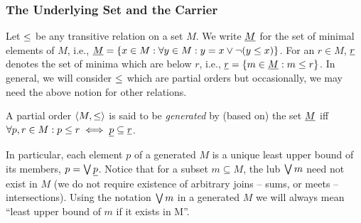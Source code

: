 \subsubsection{The Underlying Set and the Carrier}
%
Let $\leq$ be any transitive relation on a set $M$. We write $\underline {M}$
for the set of minimal elements of $M$, i.e., $\underline {M}=\{x\in
M:\forall y\in M: y= x\lor \neg(y\leq x)\}$.  For an $r\in M$, $\underline {r}$ denotes the set of minima which are below $r$, i.e., $\underline {r}
=\{m\in\underline {M} : m\leq r\}$. In general, we will consider $\leq$ which
are partial orders but occasionally, we may need the above notion for
other relations.
\begin{Definition}
A partial order $\langle M,\leq\rangle$ is said to be
{\em generated} by (based on) the set $\underline {M}$ iff
$\forall p,r\in M: p\leq r \iff \underline {p}\subseteq \underline {r}$.
\end{Definition}

In particular, each element $p$ of a generated $M$ is a unique least
upper bound of its members, $p=\bigvee \underline {p}$. Notice that for a
subset $m\subseteq M$, the lub $\bigvee m$ need not exist in $M$ (we do
not require existence of arbitrary joins -- sums, or meets --
intersections). Using the notation $\bigvee m$ in a generated $M$ we
will always mean ``least upper bound of $m$ if it exists in M''.


